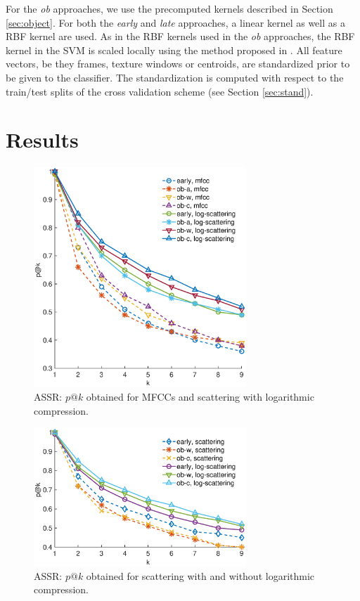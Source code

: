 \documentclass[journal]{IEEEtran}
\begin{document}
For the \emph{ob} approaches, we use the precomputed kernels described in Section \ref{sec:object}. For both the \emph{early} and \emph{late} approaches, a linear kernel as well as a RBF kernel are used. As in the RBF kernels used in the \emph{ob} approaches, the RBF kernel in the SVM is scaled locally using the method proposed in \cite{selfTuneManor2004}. All feature vectors, be they frames, texture windows or centroids, are standardized prior to be given to the classifier. The standardization is computed with respect to the train/test splits of the cross validation scheme (see Section \ref{sec:stand}).

\section{Results \label{sec:results}}

\begin{figure}
\begin{center}
\includegraphics[width=8cm]{gfx/unsupervised_test3.eps}
\caption{ASSR: $p@k$ obtained for MFCCs and scattering with logarithmic compression.}
\label{fig:ASS_1}
\end{center}
\end{figure}

\begin{figure}
\begin{center}
\includegraphics[width=8cm]{gfx/unsupervised_test2.eps}
\caption{ASSR: $p@k$ obtained for scattering with and without logarithmic compression.}
\label{fig:ASS_2}
\end{center}
\end{figure}
\end{document}
